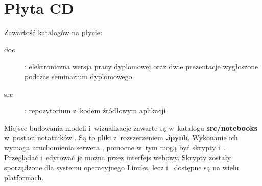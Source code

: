 \chapter{Płyta CD}\label{app:plyta}

\begin{figure}[htb]
\makebox[\textwidth]{\framebox[12.8cm]{\rule{0pt}{12.8cm}}}
\end{figure}
\pagebreak

Zawartość katalogów na płycie:
\begin{description}
    \item[doc] : elektroniczna wersja pracy dyplomowej oraz dwie prezentacje wygłoszone podczas seminarium dyplomowego
    \item[src] : repozytorium z~kodem źródłowym aplikacji
\end{description}

Miejsce budowania modeli i~wizualizacje zawarte są w~katalogu \textbf{src/notebooks} w~postaci notatników . Są to pliki z~rozszerzeniem \textbf{.ipynb}. Wykonanie ich wymaga uruchomienia serwera , pomocne w~tym mogą być skrypty  i~. Przeglądać i~edytować je można przez interfejs webowy. Skrypty zostały sporządzone dla systemu operacyjnego Linuks, lecz  i~ dostępne są na wielu platformach.

